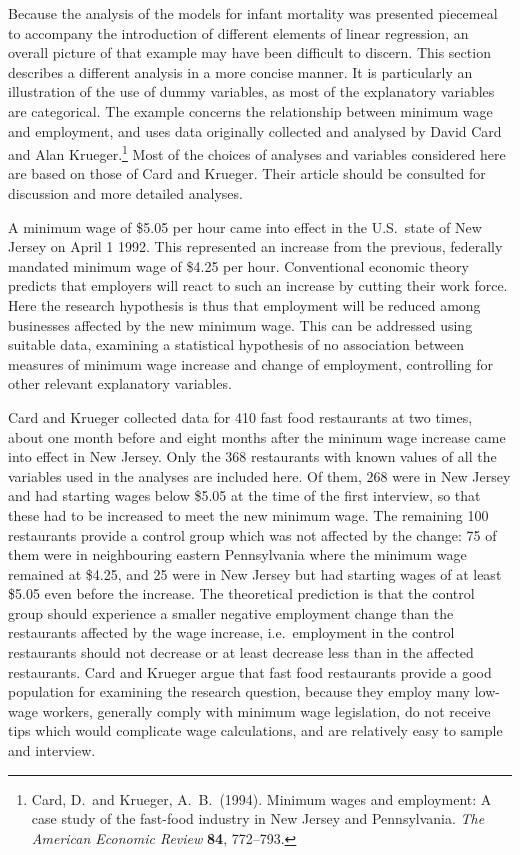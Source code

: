 Because the analysis of the models for infant mortality was presented
piecemeal to accompany the introduction of different elements of linear
regression, an overall picture of that example may have been difficult
to discern. This section describes a different analysis in a more concise
manner. It is particularly an illustration of the use of dummy
variables, as most of the explanatory variables are categorical. The
example concerns the relationship between minimum wage and employment,
and uses data originally collected and analysed by David Card and Alan
Krueger.\footnote{Card, D.\ and Krueger, A.\ B.\ (1994). Minimum wages
and employment: A case study of the fast-food industry in New Jersey and
Pennsylvania. \emph{The American Economic Review} \textbf{84}, 772--793.}
Most of the choices of analyses and
variables considered here are based on those of Card and Krueger. Their article
should be consulted for discussion and more detailed analyses.

A minimum wage of \$5.05 per hour came into effect in the U.S.\ state of
New Jersey  on April 1 1992. This represented an increase from the
previous, federally mandated minimum wage of \$4.25 per hour.
Conventional economic theory predicts that employers will react to such
an increase by cutting their work force. Here the research hypothesis is
thus that employment will be reduced among businesses affected by the
new minimum wage. This can be addressed using suitable data, examining a
statistical hypothesis of no association between measures of minimum
wage increase and change of employment, controlling for other relevant
explanatory variables.

Card and Krueger collected data for 410
fast food restaurants at two times, about one month before and eight
months after the mininum wage increase came into effect in New Jersey.
Only the 368 restaurants with known values of all the variables used in
the analyses are included here. Of them, 268 were in New Jersey and had
starting wages below \$5.05 at the time of the first interview, so that
these had to be increased to meet the new minimum wage. The remaining
100 restaurants provide a control group which was not affected by the
change: 75 of them were in neighbouring eastern Pennsylvania where the
minimum wage remained at \$4.25, and 25 were in New Jersey but had
starting wages of at least \$5.05 even before the increase. The
theoretical prediction is that the control group should experience a
smaller negative employment change than the restaurants affected by the
wage increase, i.e.\ employment in the control restaurants should not
decrease or at least decrease less than in the affected restaurants. Card and
Krueger argue that fast food restaurants provide a good population for
examining the research question, because they employ many low-wage
workers, generally comply with minimum wage legislation, do not receive
tips which would complicate wage calculations, and are relatively easy
to sample and interview.

